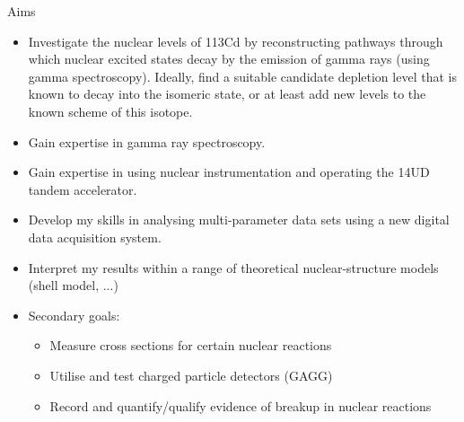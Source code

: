 \documentclass[12pt,a4paper]{article}
\begin{document}
Aims
\begin{itemize}
\item Investigate the nuclear levels of 113Cd by reconstructing pathways through which nuclear excited states decay by the emission of gamma rays (using gamma spectroscopy). Ideally, find a suitable candidate depletion level that is known to decay into the isomeric state, or at least add new levels to the known scheme of this isotope.
\item Gain expertise in gamma ray spectroscopy.
\item Gain expertise in using nuclear instrumentation and operating the 14UD tandem accelerator.
\item Develop my skills in analysing multi-parameter data sets using a new digital data acquisition system.
\item Interpret my results within a range of theoretical nuclear-structure models (shell model, ...)
\item Secondary goals:
\begin{itemize}
\item Measure cross sections for certain nuclear reactions
\item Utilise and test charged particle detectors (GAGG)
\item Record and quantify/qualify evidence of breakup in nuclear reactions
\end{itemize}
\end{itemize}
\end{document}
